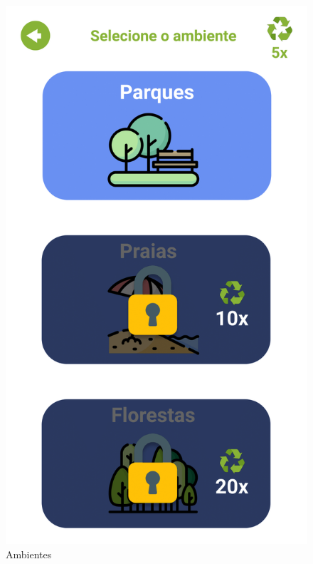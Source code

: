 \documentclass[]{scrartcl}
\begin{document}
\begin{figure}[H]
	\begin{center}
		\includegraphics[scale=0.3]{figs/Game Design-04.png}
		\caption{Ambientes}
	\end{center}
\end{figure}
\end{document}
